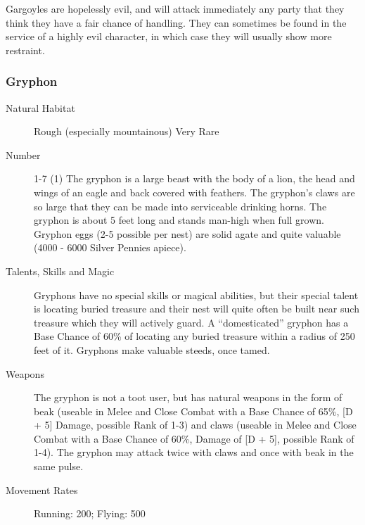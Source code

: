 \begin{multicols}{2}
\begin{description}
\setlength\itemsep{0pt}

\item[Comments] Gargoyles are hopelessly evil, and will attack immediately
any party that they think they have a fair chance of handling. They
can sometimes be found in the service of a highly evil character, in
which case they will usually show more restraint.

\end{description}

\subsubsection{Gryphon}

\begin{description}
\item[Natural Habitat] Rough (especially mountainous) Very Rare

\item[Number] 1-7 (1)
 The gryphon is a large beast with the body of a lion, the head
and wings of an eagle and back covered with feathers. The gryphon's
claws are so large that they can be made into serviceable drinking
horns. The gryphon is about 5 feet long and stands man-high when full
grown. Gryphon eggs (2-5 possible per nest) are solid agate and quite
valuable (4000 - 6000 Silver Pennies apiece).

\item[Talents, Skills and Magic] Gryphons have no special skills or magical abilities, but
their special talent is locating buried treasure and their nest will
quite often be built near such treasure which they will actively
guard. A ``domesticated'' gryphon has a Base Chance of 60\% of
locating any buried treasure within a radius of 250 feet of
it. Gryphons make valuable steeds, once tamed.

\item[Weapons] The gryphon is not a toot user, but has natural weapons in
the form of beak (useable in Melee and Close Combat with a Base Chance
of 65\%, [D + 5] Damage, possible Rank of 1-3) and claws (useable
in Melee and Close Combat with a Base Chance of 60\%, Damage of
[D + 5], possible Rank of 1-4). The gryphon may attack twice with
claws and once with beak in the same pulse.


\item[Movement Rates] Running: 200; Flying: 500


\end{description}
\end{multicols}
